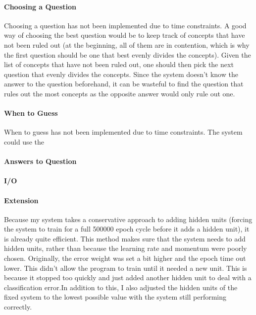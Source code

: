 \documentclass[12pt]{article}
\begin{document}
\paragraph*{Choosing a Question}
Choosing a question has not been implemented due to time constraints. A good way of choosing the best question would be to keep track of concepts that have not been ruled out (at the beginning, all of them are in contention, which is why the first question should be one that best evenly divides the concepts). Given the list of concepts that have not been ruled out, one should then pick the next question that evenly divides the concepts. Since the system doesn't know the answer to the question beforehand, it can be wasteful to find the question that rules out the most concepts as the opposite answer would only rule out one. 

\paragraph*{When to Guess}
When to guess has not been implemented due to time constraints. The system could use the 

\paragraph*{Answers to Question}

\paragraph*{I/O}

\paragraph*{Extension}
Because my system takes a conservative approach to adding hidden units (forcing the system to train for a full 500000 epoch cycle before it adds a hidden unit), it is already quite efficient. This method makes sure that the system needs to add hidden units, rather than because the learning rate and momentum were poorly chosen. Originally, the error weight was set a bit higher and the epoch time out lower. This didn't allow the program to train until it needed a new unit. This is because it stopped too quickly and just added another hidden unit to deal with a classification error.In addition to this, I also adjusted the hidden units of the fixed system to the lowest possible value with the system still performing correctly.
\end{document}
